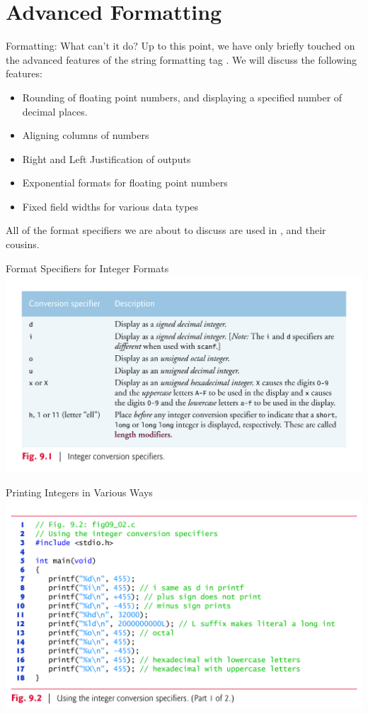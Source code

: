 \documentclass[11pt]{beamer}
\let\OldTexttt\texttt
\renewcommand{\texttt}[1]{\OldTexttt{\color{teal}{#1}}}
\begin{document}
\section[Formatting]{Advanced Formatting}
\begin{frame}{Formatting: What can't it do?}
Up to this point, we have only briefly touched on the advanced features of the string formatting tag \texttt{\%}.  We will discuss the following features:
\begin{itemize}
\item Rounding of floating point numbers, and displaying a specified number of decimal places.
\item Aligning columns of numbers
\item Right and Left Justification of outputs
\item Exponential formats for floating point numbers
\item Fixed field widths for various data types
\end{itemize}
All of the format specifiers we are about to discuss are used in \texttt{printf()}, \texttt{scanf()} and their cousins.
\end{frame}

\begin{frame}{Format Specifiers for Integer Formats}
\center
\includegraphics[scale=0.12]{integers.png}
\end{frame}

\begin{frame}{Printing Integers in Various Ways}
\center
\includegraphics[scale=0.12]{intExample1.png}
\end{frame}
\end{document}

